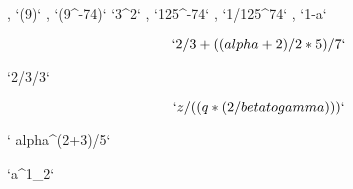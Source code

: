 
\def\binOp#1{\message{binOp: Something went wrong...\noexpand#1@}}


\def\startTrace{\message{Starting trace...@}%
    \tracingmacros=2\tracingassigns=2\tracingcommands=0%
}
\def\endTrace{\message{Ending trace...}\tracingmacros=0\tracingassigns=0\tracingcommands=0}


, `(9)`
, `(9^-74)`
`3^2`
, `125^-74`
, `1/125^74`
, `1-a`


$$` 2/3 + ((alpha+2)/2 * 5)/7`$$

`2/3/3`

$$` z/((q*(2/beta to gamma)))`$$

` alpha^(2+3)/5`

`a^1_2`

\bye
